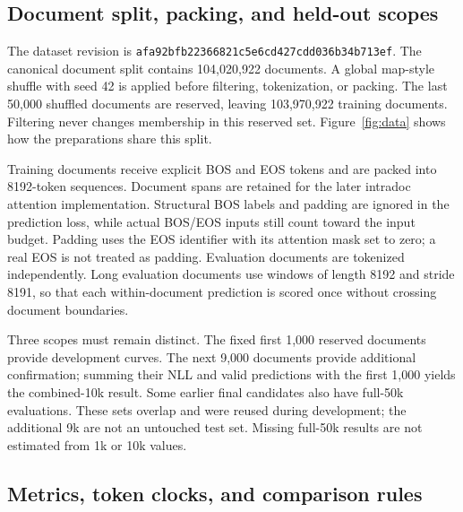 

\subsection{Document split, packing, and held-out scopes}

The dataset revision is \texttt{afa92bfb22366821c5e6cd427cdd036b34b713ef}. The canonical document split contains 104,020,922 documents. A global map-style shuffle with seed 42 is applied before filtering, tokenization, or packing. The last 50,000 shuffled documents are reserved, leaving 103,970,922 training documents. Filtering never changes membership in this reserved set. Figure~\ref{fig:data} shows how the preparations share this split.

Training documents receive explicit BOS and EOS tokens and are packed into 8192-token sequences. Document spans are retained for the later intradoc attention implementation. Structural BOS labels and padding are ignored in the prediction loss, while actual BOS/EOS inputs still count toward the input budget. Padding uses the EOS identifier with its attention mask set to zero; a real EOS is not treated as padding. Evaluation documents are tokenized independently. Long evaluation documents use windows of length 8192 and stride 8191, so that each within-document prediction is scored once without crossing document boundaries.

Three scopes must remain distinct. The fixed first 1,000 reserved documents provide development curves. The next 9,000 documents provide additional confirmation; summing their NLL and valid predictions with the first 1,000 yields the combined-10k result. Some earlier final candidates also have full-50k evaluations. These sets overlap and were reused during development; the additional 9k are not an untouched test set. Missing full-50k results are not estimated from 1k or 10k values.


\subsection{Metrics, token clocks, and comparison rules}

